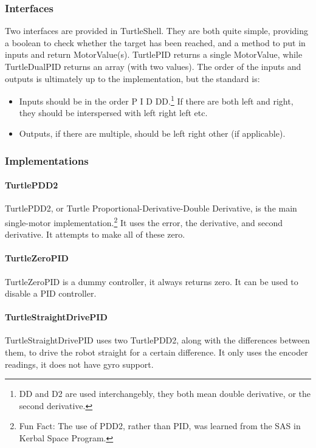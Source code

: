 \documentclass[]{report}
\begin{document}
\subsubsection{Interfaces}
Two interfaces are provided in TurtleShell.
They are both quite simple, providing a boolean to check whether the target has been reached, and a method to put in inputs and return MotorValue(s).
TurtlePID returns a single MotorValue, while TurtleDualPID returns an array (with two values).
The order of the inputs and outputs is ultimately up to the implementation, but the standard is:
\begin{itemize}
\item Inputs should be in the order P \textrightarrow{} I \textrightarrow{} D \textrightarrow{} DD.\footnote{DD and D2 are used interchangebly, they both mean double derivative, or the second derivative.}
If there are both left and right, they should be interspersed with left \textrightarrow{} right \textrightarrow{} left \textrightarrow{} etc.
\item Outputs, if there are multiple, should be left \textrightarrow{} right \textrightarrow{} other (if applicable).
\end{itemize}

\subsubsection{Implementations}

\paragraph{TurtlePDD2}
TurtlePDD2, or Turtle Proportional-Derivative-Double Derivative, is the main single-motor implementation.\footnote{Fun Fact: The use of PDD2, rather than PID, was learned from the SAS in Kerbal Space Program.}
It uses the error, the derivative, and second derivative.
It attempts to make all of these zero.

\paragraph{TurtleZeroPID}
TurtleZeroPID is a dummy controller, it always returns zero.
It can be used to disable a PID controller.

\paragraph{TurtleStraightDrivePID}
TurtleStraightDrivePID uses two TurtlePDD2, along with the differences between them, to drive the robot straight for a certain difference.
It only uses the encoder readings, it does not have gyro support.
\end{document}
